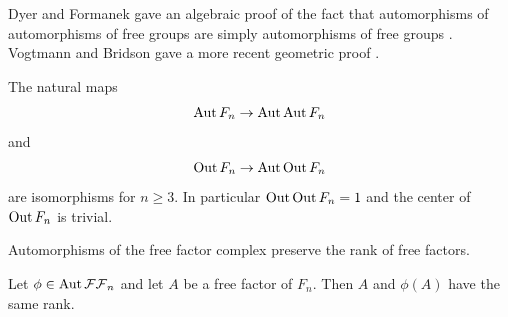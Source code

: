 %
%



Dyer and Formanek gave an algebraic proof
of the fact that automorphisms of automorphisms of free groups are simply automorphisms of free groups \cite{doi:10.1112/jlms/s2-11.2.181}.
Vogtmann and Bridson gave a more recent geometric proof \cite{MR1769698}.
\begin{theorem}
  The natural maps
  $$\operatorname{Aut} F_n \to \operatorname{Aut} \operatorname{Aut} F_n$$
  and
  $$\operatorname{Out} F_n \to \operatorname{Aut} \operatorname{Out} F_n$$
  are isomorphisms for $n \geq 3$.
  In particular $\operatorname{Out} \operatorname{Out} F_n =1$ and the center of $\operatorname{Out} F_n$ is trivial.
  \label{theorem:outout}
\end{theorem}


\begin{lemma} Automorphisms of the free factor complex preserve the rank of free factors.

  Let $\phi \in \operatorname{Aut} { \mathcal {FF}_n }$ and let $A$ be a free factor of $F_n$.
  Then $A$ and $\phi(A)$ have the same rank.
  \label{lemma:ffsize}
\end{lemma}

